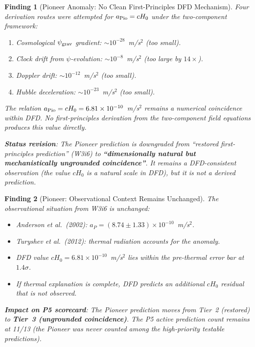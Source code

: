\documentclass[11pt]{article}
\newtheorem{finding}{Finding}
\newcommand{\ee}[1]{\times 10^{#1}}
\newcommand{\psigrav}{\psi_{\rm grav}}
\newcommand{\Hzero}{H_0}
\begin{document}
\begin{finding}[Pioneer Anomaly: No Clean First-Principles DFD Mechanism]
\label{find:Pioneer-no-mechanism}
Four derivation routes were attempted for $a_{\rm Pio} = c\Hzero$
under the two-component framework:
\begin{enumerate}[nosep]
\item Cosmological $\psigrav$ gradient: $\sim 10^{-28}$~m/s$^2$ (too small).
\item Clock drift from $\psi$-evolution: $\sim 10^{-8}$~m/s$^2$ (too large by $14\times$).
\item Doppler drift: $\sim 10^{-12}$~m/s$^2$ (too small).
\item Hubble deceleration: $\sim 10^{-23}$~m/s$^2$ (too small).
\end{enumerate}

The relation $a_{\rm Pio} = c\Hzero = 6.81\ee{-10}$~m/s$^2$ remains a
\emph{numerical coincidence} within DFD. No first-principles derivation
from the two-component field equations produces this value directly.

\textbf{Status revision}: The Pioneer prediction is downgraded from
``restored first-principles prediction'' (W3i6) to
\textbf{``dimensionally natural but mechanistically ungrounded
coincidence''}. It remains a DFD-consistent observation (the value
$c\Hzero$ is a natural scale in DFD), but it is not a derived prediction.
\end{finding}

\begin{finding}[Pioneer: Observational Context Remains Unchanged]
\label{find:Pioneer-obs-context}
The observational situation from W3i6 is unchanged:
\begin{itemize}[nosep]
\item Anderson et al.\ (2002): $a_P = (8.74 \pm 1.33)\ee{-10}$~m/s$^2$.
\item Turyshev et al.\ (2012): thermal radiation accounts for the anomaly.
\item DFD value $c\Hzero = 6.81\ee{-10}$~m/s$^2$ lies within the
  pre-thermal error bar at $1.4\sigma$.
\item If thermal explanation is complete, DFD predicts an
  \emph{additional} $c\Hzero$ residual that is not observed.
\end{itemize}

\textbf{Impact on P5 scorecard}: The Pioneer prediction moves from
Tier~2 (restored) to \textbf{Tier~3 (ungrounded coincidence)}.
The P5 active prediction count remains at 11/13 (the Pioneer was
never counted among the high-priority testable predictions).
\end{finding}
\end{document}
